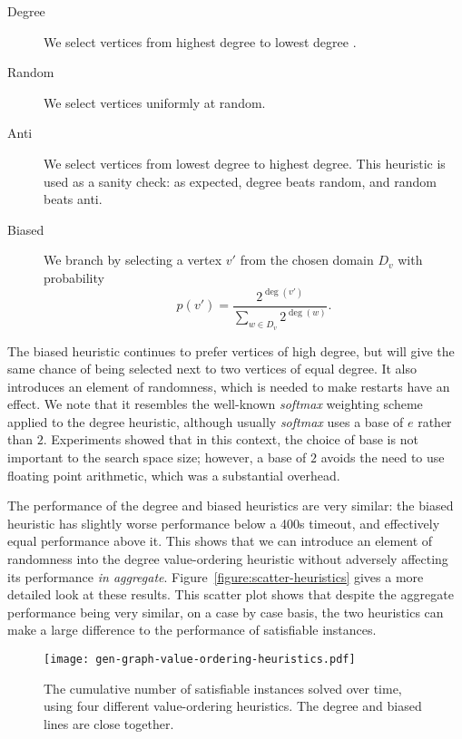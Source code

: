 \documentclass[a4paper,UKenglish]{lipics-v2018}
\newcommand{\Figureref}[1]{Figure~\ref{#1}}
\begin{document}
\begin{description}
\item[Degree] We select vertices from highest degree to lowest degree
\cite{DBLP:conf/ijcai/McCreeshPT16}.

\item[Random] We select vertices uniformly at random.

\item[Anti] We select vertices from lowest degree to highest degree. This heuristic is used as
a sanity check: as expected, degree beats random, and random beats anti.

\item[Biased] We branch by selecting a vertex $v'$ from the chosen domain $D_v$ with
probability \[ p(v') = \frac{2^{\deg(v')}}{\sum_{w \in D_v}{2^{\deg(w)}}} \text{.} \]\end{description}

The biased heuristic continues to prefer vertices of high degree, but will give the same chance of
being selected next to two vertices of equal degree.  It also introduces an element of randomness,
which is needed to make restarts have an effect.  We note that it resembles the well-known
\emph{softmax} weighting scheme applied to the degree heuristic, although usually \emph{softmax}
uses a base of $e$ rather than $2$.  Experiments showed that in this context, the choice of base is
not important to the search space size; however, a base of $2$ avoids the need to use floating point
arithmetic, which was a substantial overhead.

The performance of the degree and biased heuristics are very similar: the
biased heuristic has slightly worse performance below a 400s timeout, and effectively equal
performance above it. This shows that we can introduce an element of randomness into the degree
value-ordering heuristic without adversely affecting its performance \emph{in aggregate}.
\Figureref{figure:scatter-heuristics} gives a more detailed look at these results. This scatter plot
shows that despite the aggregate performance being very similar, on a case by case basis, the two
heuristics can make a large difference to the performance of satisfiable instances.

\begin{figure}[p]
    \centering
    \texttt{[image: gen-graph-value-ordering-heuristics.pdf]}

    \caption{The cumulative number of satisfiable instances solved over time, using four
    different value-ordering heuristics. The degree and biased lines are close together.}
    \label{figure:value-ordering-heuristics}
\end{figure}
\end{document}

